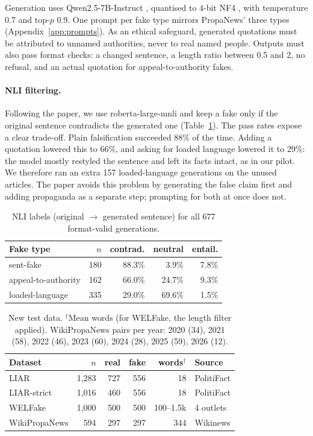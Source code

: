 \documentclass[11pt]{article}
\begin{document}
Generation uses Qwen2.5-7B-Instruct \citep{qwen2024qwen25}, quantised to 4-bit NF4 \citep{dettmers2023qlora}, with temperature 0.7 and top-$p$ 0.9. One prompt per fake type mirrors PropaNews' three types (Appendix~\ref{app:prompts}). As an ethical safeguard, generated quotations must be attributed to unnamed authorities, never to real named people. Outputs must also pass format checks: a changed sentence, a length ratio between 0.5 and 2, no refusal, and an actual quotation for appeal-to-authority fakes.

\paragraph{NLI filtering.} Following the paper, we use roberta-large-mnli and keep a fake only if the original sentence contradicts the generated one (Table~\ref{tab:nli}). The pass rates expose a clear trade-off. Plain falsification succeeded 88\% of the time. Adding a quotation lowered this to 66\%, and asking for loaded language lowered it to 29\%: the model mostly restyled the sentence and left its facts intact, as in our pilot. We therefore ran an extra 157 loaded-language generations on the unused articles. The paper avoids this problem by generating the false claim first and adding propaganda as a separate step; prompting for both at once does not.

\begin{table}[t]
\centering\small
\setlength{\tabcolsep}{4pt}
\begin{tabular}{lrrrr}
\toprule
Fake type & $n$ & contrad. & neutral & entail. \\
\midrule
sent-fake & 180 & 88.3\% & 3.9\% & 7.8\% \\
appeal-to-authority & 162 & 66.0\% & 24.7\% & 9.3\% \\
loaded-language & 335 & 29.0\% & 69.6\% & 1.5\% \\
\bottomrule
\end{tabular}
\caption{NLI labels (original $\rightarrow$ generated sentence) for all 677 format-valid generations.}
\label{tab:nli}
\end{table}

\begin{table}[t]
\centering\small
\setlength{\tabcolsep}{2pt}
\footnotesize\begin{tabular}{lrrrrl}
\toprule
Dataset & $n$ & real & fake & words$^\dagger$ & Source \\
\midrule
LIAR & 1,283 & 727 & 556 & 18 & PolitiFact \\
LIAR-strict & 1,016 & 460 & 556 & 18 & PolitiFact \\
WELFake & 1,000 & 500 & 500 & 100--1.5k & 4 outlets \\
WikiPropaNews & 594 & 297 & 297 & 344 & Wikinews \\
\bottomrule
\end{tabular}
\caption{New test data. $^\dagger$Mean words (for WELFake, the length filter applied). WikiPropaNews pairs per year: 2020 (34), 2021 (58), 2022 (46), 2023 (60), 2024 (28), 2025 (59), 2026 (12).}
\label{tab:newdata}
\end{table}
\end{document}
